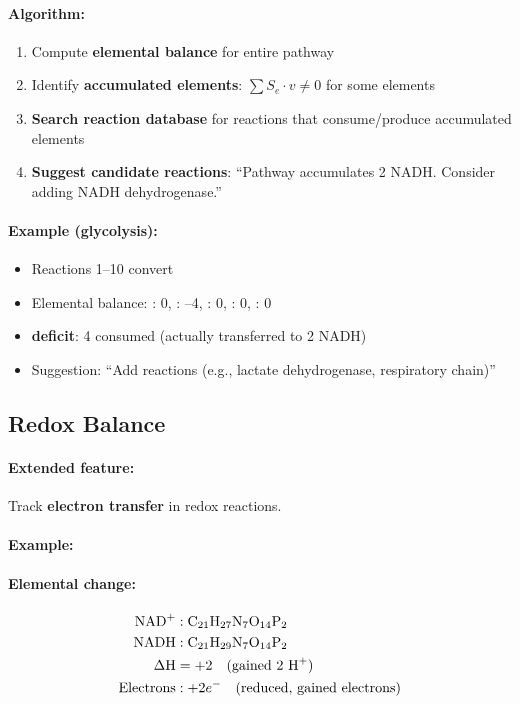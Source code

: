 \paragraph{Algorithm:}
\begin{enumerate}
    \item Compute \textbf{elemental balance} for entire pathway
    \item Identify \textbf{accumulated elements}: $\sum S_e \cdot v \neq 0$ for some elements
    \item \textbf{Search reaction database} for reactions that consume/produce accumulated elements
    \item \textbf{Suggest candidate reactions}: ``Pathway accumulates 2 NADH. Consider adding NADH dehydrogenase.''
\end{enumerate}

\paragraph{Example (glycolysis):}
\begin{itemize}
    \item Reactions 1--10 convert 
    \item Elemental balance: : 0, : --4, : 0, : 0, : 0
    \item \textbf{ deficit}: 4  consumed (actually transferred to 2 NADH)
    \item Suggestion: ``Add  reactions (e.g., lactate dehydrogenase, respiratory chain)''
\end{itemize}

\subsection{Redox Balance}
\label{subsec:redox-balance}

\paragraph{Extended feature:} Track \textbf{electron transfer} in redox reactions.

\paragraph{Example:} 

\paragraph{Elemental change:}
\begin{align}
\ce{NAD+} &: \ce{C21H27N7O14P2} \\
\ce{NADH} &: \ce{C21H29N7O14P2} \\
\Delta\ce{H} &= +2 \quad \text{(gained 2 \ce{H+})} \\
\text{Electrons} &: +2 e^- \quad \text{(reduced, gained electrons)}
\end{align}

